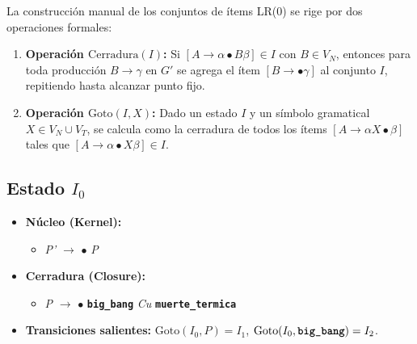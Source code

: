 \documentclass[12pt, letterpaper]{article}
\begin{document}
La construcción manual de los conjuntos de ítems LR(0) se rige por dos operaciones formales:

\begin{enumerate}\setlength{\itemsep}{2pt}\setlength{\parskip}{0pt}
    \item \textbf{Operación $\text{Cerradura}(I)$:} Si $[A \to \alpha \bullet B \beta] \in I$ con $B \in V_N$, entonces para toda producción $B \to \gamma$ en $G'$ se agrega el ítem $[B \to \bullet \gamma]$ al conjunto $I$, repitiendo hasta alcanzar punto fijo.
    \item \textbf{Operación $\text{Goto}(I, X)$:} Dado un estado $I$ y un símbolo gramatical $X \in V_N \cup V_T$, se calcula como la cerradura de todos los ítems $[A \to \alpha X \bullet \beta]$ tales que $[A \to \alpha \bullet X \beta] \in I$.
\end{enumerate}

\subsection*{Estado $I_{0}$ }
\begin{itemize}\setlength{\itemsep}{1pt}\setlength{\parskip}{0pt}
\item \textbf{Núcleo (Kernel):}
\begin{itemize}\setlength{\itemsep}{1pt}\setlength{\parskip}{0pt}
    \item \textit{P'} $\to$ $\bullet$ \textit{P}
\end{itemize}
\item \textbf{Cerradura (Closure):}
\begin{itemize}\setlength{\itemsep}{1pt}\setlength{\parskip}{0pt}
    \item \textit{P} $\to$ $\bullet$ \textbf{\texttt{big\_bang}} \textit{Cu} \textbf{\texttt{muerte\_termica}}
\end{itemize}
\item \textbf{Transiciones salientes:} $\text{Goto}(I_{0}, \textit{P}) = I_{1}$, \quad $\text{Goto}(I_{0}, \textbf{\texttt{big\_bang}}) = I_{2}$.
\end{itemize}
\vspace{2pt}
\end{document}

